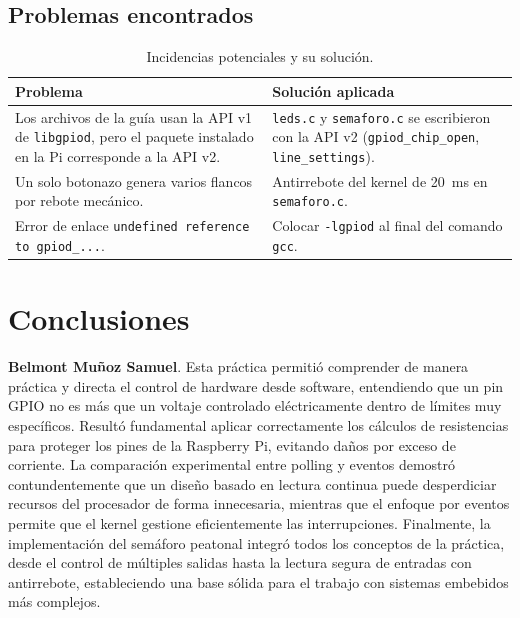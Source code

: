 \documentclass[conference]{IEEEtran}
\begin{document}
\subsection{Problemas encontrados}

\begin{table}[t]
	\centering
	\caption{Incidencias potenciales y su solución.}
	\label{tab:problemas}
	\begin{tabular}{|p{3.3cm}|p{4.1cm}|}
		\hline
		\textbf{Problema} & \textbf{Solución aplicada} \\
		\hline
		Los archivos de la guía usan la API v1 de \texttt{libgpiod}, pero el paquete instalado en la Pi corresponde a la API v2. & \texttt{leds.c} y \texttt{semaforo.c} se escribieron con la API v2 (\texttt{gpiod\_chip\_open}, \texttt{line\_settings}). \\
		\hline
		Un solo botonazo genera varios flancos por rebote mecánico. & Antirrebote del kernel de 20~ms en \texttt{semaforo.c}. \\
		\hline
		Error de enlace \texttt{undefined reference to gpiod\_...}. & Colocar \texttt{-lgpiod} al final del comando \texttt{gcc}. \\
		\hline
	\end{tabular}
\end{table}

\section{Conclusiones}

\textbf{Belmont Muñoz Samuel}. Esta práctica permitió comprender de manera práctica y directa el control de hardware desde software, entendiendo que un pin GPIO no es más que un voltaje controlado eléctricamente dentro de límites muy específicos. Resultó fundamental aplicar correctamente los cálculos de resistencias para proteger los pines de la Raspberry Pi, evitando daños por exceso de corriente. La comparación experimental entre polling y eventos demostró contundentemente que un diseño basado en lectura continua puede desperdiciar recursos del procesador de forma innecesaria, mientras que el enfoque por eventos permite que el kernel gestione eficientemente las interrupciones. Finalmente, la implementación del semáforo peatonal integró todos los conceptos de la práctica, desde el control de múltiples salidas hasta la lectura segura de entradas con antirrebote, estableciendo una base sólida para el trabajo con sistemas embebidos más complejos.
\end{document}
